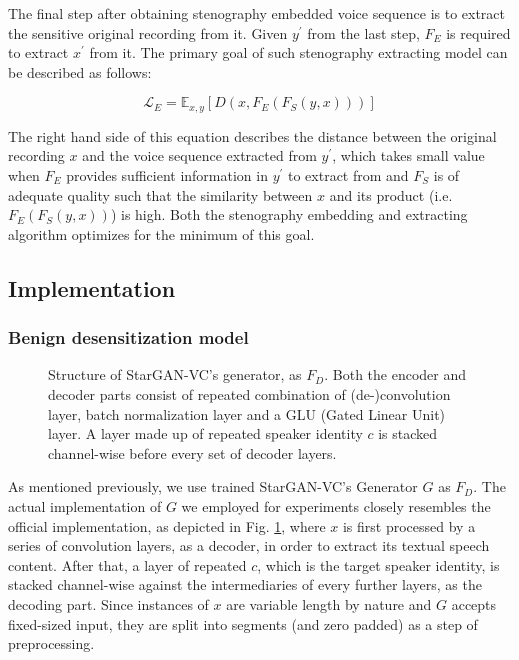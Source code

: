 \documentclass[journal]{IEEEtran} %
\begin{document}
The final step after obtaining stenography embedded voice sequence is to extract the sensitive original recording from it. Given $y^{\prime}$ from the last step, $F_E$ is required to extract $x^{\prime}$ from it. The primary goal of such stenography extracting model can be described as follows:

\begin{equation}
    \label{eqn:extract_loss}
    \mathcal{L}_E = \mathbb{E}_{x, y}[D(x, F_E(F_S(y, x)))]
\end{equation}

The right hand side of this equation describes the distance between the original recording $x$ and the voice sequence extracted from $y^{\prime}$, which takes small value when $F_E$ provides sufficient information in $y^{\prime}$ to extract from and $F_S$ is of adequate quality such that the similarity between $x$ and its product (i.e. $F_E(F_S(y, x))$) is high. Both the stenography embedding and extracting algorithm optimizes for the minimum of this goal.

\subsection{Implementation}

\subsubsection{Benign desensitization model}

\begin{figure}[!t]
    \caption{Structure of StarGAN-VC's generator, as $F_D$. Both the encoder and decoder parts consist of repeated combination of (de-)convolution layer, batch normalization layer and a GLU (Gated Linear Unit) layer. A layer made up of repeated speaker identity $c$ is stacked channel-wise before every set of decoder layers.}
    \label{fig:sgvc_impl}
\end{figure}

As mentioned previously, we use trained StarGAN-VC's Generator $G$ as $F_D$. The actual implementation of $G$ we employed for experiments closely resembles the official implementation, as depicted in Fig. \ref{fig:sgvc_impl}, where $x$ is first processed by a series of convolution layers, as a decoder, in order to extract its textual speech content. After that, a layer of repeated $c$, which is the target speaker identity, is stacked channel-wise against the intermediaries of every further layers, as the decoding part. Since instances of $x$ are variable length by nature and $G$ accepts fixed-sized input, they are split into segments (and zero padded) as a step of preprocessing.
\end{document}
